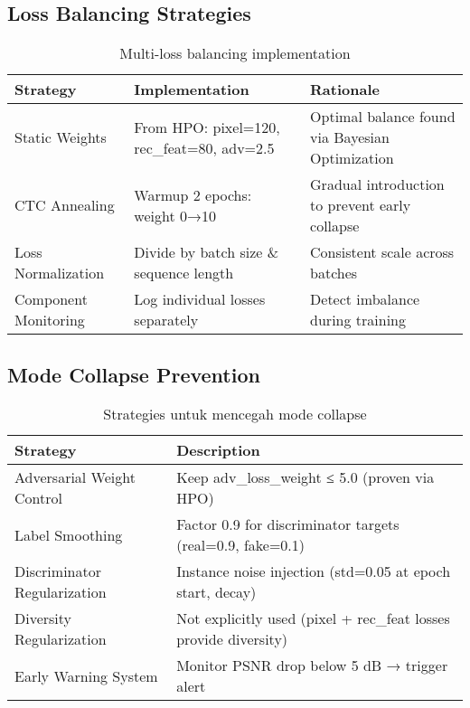 \documentclass[12pt,a4paper]{article}
\begin{document}
\subsection{Loss Balancing Strategies}

\begin{table}[H]
\centering
\caption{Multi-loss balancing implementation}
\label{tab:appendix-loss-balancing}
\small
\begin{tabular}{|l|l|p{6.5cm}|}
\hline
\textbf{Strategy} & \textbf{Implementation} & \textbf{Rationale} \\ \hline
Static Weights & From HPO: pixel=120, rec\_feat=80, adv=2.5 & Optimal balance found via Bayesian Optimization \\ \hline
CTC Annealing & Warmup 2 epochs: weight 0→10 & Gradual introduction to prevent early collapse \\ \hline
Loss Normalization & Divide by batch size \& sequence length & Consistent scale across batches \\ \hline
Component Monitoring & Log individual losses separately & Detect imbalance during training \\ \hline
\end{tabular}
\end{table}

\subsection{Mode Collapse Prevention}

\begin{table}[H]
\centering
\caption{Strategies untuk mencegah mode collapse}
\label{tab:appendix-mode-collapse}
\small
\begin{tabular}{|l|p{10cm}|}
\hline
\textbf{Strategy} & \textbf{Description} \\ \hline
Adversarial Weight Control & Keep adv\_loss\_weight ≤ 5.0 (proven via HPO) \\ \hline
Label Smoothing & Factor 0.9 for discriminator targets (real=0.9, fake=0.1) \\ \hline
Discriminator Regularization & Instance noise injection (std=0.05 at epoch start, decay) \\ \hline
Diversity Regularization & Not explicitly used (pixel + rec\_feat losses provide diversity) \\ \hline
Early Warning System & Monitor PSNR drop below 5 dB → trigger alert \\ \hline
\end{tabular}
\end{table}
\end{document}
